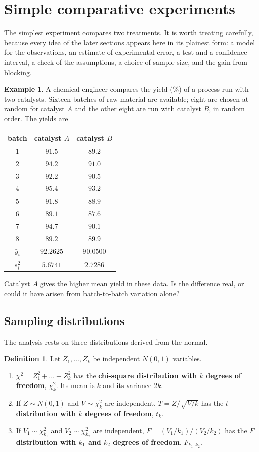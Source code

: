\documentclass[11pt,a4paper]{article}
\numberwithin{equation}{section}
\theoremstyle{definition}
\newtheorem{defn}[thm]{Definition}
\newtheorem{exa}[thm]{Example}
\begin{document}
\section{Simple comparative experiments}
The simplest experiment compares two treatments. It is worth treating carefully, because every idea of the later sections appears here in its
plainest form: a model for the observations, an estimate of experimental error, a test and a confidence interval, a check of the assumptions,
a choice of sample size, and the gain from blocking.

\begin{exa}\label{exa:catalyst}
A chemical engineer compares the yield (\%) of a process run with two catalysts. Sixteen batches of raw material are available; eight are
chosen at random for catalyst $A$ and the other eight are run with catalyst $B$, in random order. The yields are
\begin{center}
\begin{tabular}{c|cc}
batch & catalyst $A$ & catalyst $B$ \\
\hline
$1$ & $91.5$ & $89.2$ \\
$2$ & $94.2$ & $91.0$ \\
$3$ & $92.2$ & $90.5$ \\
$4$ & $95.4$ & $93.2$ \\
$5$ & $91.8$ & $88.9$ \\
$6$ & $89.1$ & $87.6$ \\
$7$ & $94.7$ & $90.1$ \\
$8$ & $89.2$ & $89.9$ \\
\hline
$\bar y_i$ & $92.2625$ & $90.0500$ \\
$s_i^2$ & $5.6741$ & $2.7286$
\end{tabular}
\end{center}
Catalyst $A$ gives the higher mean yield in these data. Is the difference real, or could it have arisen from batch-to-batch variation alone?
\end{exa}

\subsection{Sampling distributions}
The analysis rests on three distributions derived from the normal.

\begin{defn}
Let $Z_1, \dots, Z_k$ be independent $N(0, 1)$ variables.
\begin{enumerate}[label=(\roman*)]
\item $\chi^2 = Z_1^2 + \dots + Z_k^2$ has the \textbf{chi-square distribution with $k$ degrees of freedom}, $\chi^2_k$. Its mean is $k$ and its variance $2k$.
\item If $Z \sim N(0, 1)$ and $V \sim \chi^2_k$ are independent, $T = Z/\sqrt{V/k}$ has the \textbf{$t$ distribution with $k$ degrees of freedom}, $t_k$.
\item If $V_1 \sim \chi^2_{k_1}$ and $V_2 \sim \chi^2_{k_2}$ are independent, $F = (V_1/k_1)/(V_2/k_2)$ has the \textbf{$F$ distribution with $k_1$ and $k_2$ degrees of
freedom}, $F_{k_1,k_2}$.
\end{enumerate}
\end{defn}
\end{document}
